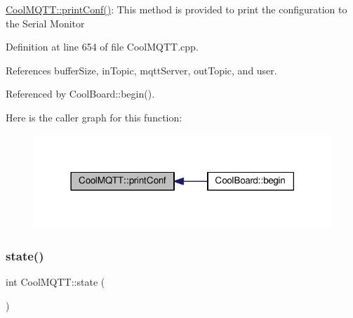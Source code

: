 \hyperlink{class_cool_m_q_t_t_a40553a0ad4b5ecf1cb4411ab54ca85fb}{Cool\+M\+Q\+T\+T\+::print\+Conf()}\+: This method is provided to print the configuration to the Serial Monitor 

Definition at line 654 of file Cool\+M\+Q\+T\+T.\+cpp.



References buffer\+Size, in\+Topic, mqtt\+Server, out\+Topic, and user.



Referenced by Cool\+Board\+::begin().

Here is the caller graph for this function\+:\nopagebreak
\begin{figure}[H]
\begin{center}
\leavevmode
\includegraphics[width=318pt]{d0/dd0/class_cool_m_q_t_t_a40553a0ad4b5ecf1cb4411ab54ca85fb_icgraph}
\end{center}
\end{figure}
\mbox{\label{class_cool_m_q_t_t_a5d003307eff78efbd585e42b43b72b6d}} 
\subsubsection{\texorpdfstring{state()}{state()}}
{\footnotesize\ttfamily int Cool\+M\+Q\+T\+T\+::state (\begin{DoxyParamCaption}{ }\end{DoxyParamCaption})}


